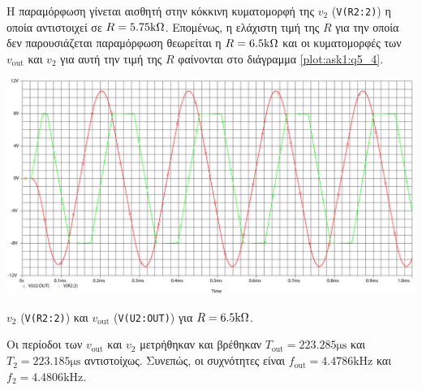 Η παραμόρφωση γίνεται αισθητή στην κόκκινη κυματομορφή της $v_2$ (\texttt{V(R2:2)}) η οποία αντιστοιχεί σε $R=5.75\kohm$. Επομένως, η ελάχιστη τιμή της $R$ για την οποία δεν παρουσιάζεται παραμόρφωση θεωρείται η $R=6.5\kohm$ και οι κυματομορφές των $v_{\mathrm{out}}$ και $v_2$ για αυτή την  τιμή της $R$ φαίνονται στο διάγραμμα \ref{plot:ask1:q5_4}.

\begin{plot_fig}[H]
	\begin{center}
		\includegraphics[width=15cm]{spice_01/q5_4.pdf}
		\caption{$v_2$ (\texttt{V(R2:2)}) και $v_{\mathrm{out}}$ (\texttt{V(U2:OUT)}) για $R=6.5\kohm$.}
		\label{plot:ask1:q5_4}
	\end{center}
\end{plot_fig}

Οι περίοδοι των $v_{\mathrm{out}}$ και $v_2$ μετρήθηκαν και βρέθηκαν $T_{\mathrm{out}}=223.285\unit{\micro\second}$ και $T_{2}=223.185\unit{\micro\second}$ αντιστοίχως. Συνεπώς, οι συχνότητες είναι $f_{\mathrm{out}}=4.4786\unit{\kilo\hertz}$ και $f_2=4.4806\unit{\kilo\hertz}$.